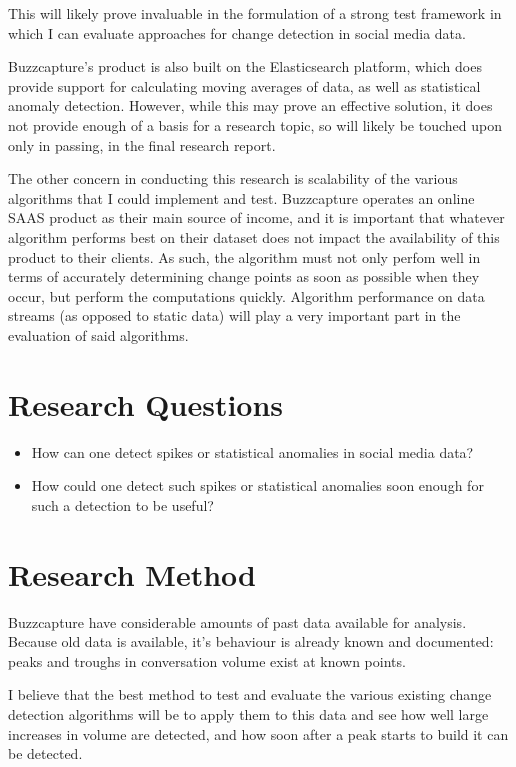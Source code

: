 \documentclass{uvamscse}
\begin{document}
This will likely prove invaluable in the formulation of a strong test framework in which I can evaluate approaches for change detection in social media data.

Buzzcapture’s product is also built on the Elasticsearch platform, which does provide support for calculating moving averages of data, as well as statistical anomaly detection\cite{ESMovingAverages}. However, while this may prove an effective solution, it does not provide enough of a basis for a research topic, so will likely be touched upon only in passing, in the final research report.

The other concern in conducting this research is scalability of the various algorithms that I could implement and test. Buzzcapture operates an online SAAS product as their main source of income, and it is important that whatever algorithm performs best on their dataset does not impact the availability of this product to their clients. As such, the algorithm must not only perfom well in terms of accurately determining change points as soon as possible when they occur, but perform the computations quickly. Algorithm performance on data streams (as opposed to static data) will play a very important part in the evaluation of said algorithms.

\section{Research Questions}

\begin{itemize}
	\item How can one detect spikes or statistical anomalies in social media data?
	\item How could one detect such spikes or statistical anomalies soon enough for such a detection to
be useful?
\end{itemize}

\section{Research Method}

Buzzcapture have considerable amounts of past data available for analysis. Because old data is available, it’s behaviour is already known and documented: peaks and troughs in conversation volume exist at known points.

I believe that the best method to test and evaluate the various existing change detection algorithms will be to apply them to this data and see how well large increases in volume are detected, and how soon after a peak starts to build it can be detected.
\end{document}
